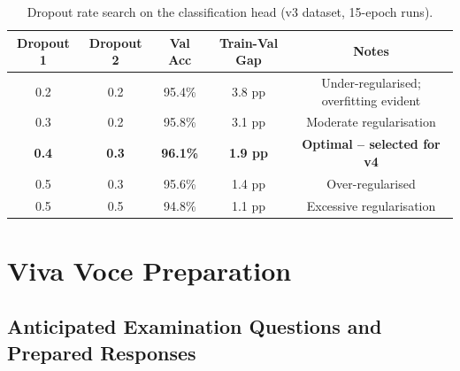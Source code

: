 \documentclass[12pt,a4paper,oneside]{report}
\begin{document}
\begin{table}[H]
\centering
\caption{Dropout rate search on the classification head (v3 dataset, 15-epoch runs).}
\label{tab:dropout_search}
\renewcommand{\arraystretch}{1.3}
\begin{tabular}{ccccc}
\toprule
\textbf{Dropout 1} & \textbf{Dropout 2} & \textbf{Val Acc} &
\textbf{Train-Val Gap} & \textbf{Notes} \\
\midrule
0.2 & 0.2 & 95.4\% & 3.8 pp & Under-regularised; overfitting evident \\
0.3 & 0.2 & 95.8\% & 3.1 pp & Moderate regularisation \\
\textbf{0.4} & \textbf{0.3} & \textbf{96.1\%} & \textbf{1.9 pp} & \textbf{Optimal -- selected for v4} \\
0.5 & 0.3 & 95.6\% & 1.4 pp & Over-regularised \\
0.5 & 0.5 & 94.8\% & 1.1 pp & Excessive regularisation \\
\bottomrule
\end{tabular}
\end{table}

\chapter{Viva Voce Preparation}
\label{app:viva}

\section{Anticipated Examination Questions and Prepared Responses}
\end{document}

